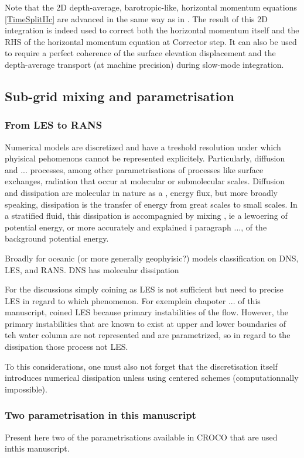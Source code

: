 Note that the 2D depth-average, barotropic-like, horizontal momentum equations \ref{TimeSplitIIc} are advanced in the same way as in \cite{shchepetkin_regional_2005}. The result of this 2D integration is indeed used to correct both the horizontal momentum itself and the RHS of the horizontal momentum equation at Corrector step. It can also be used to require a perfect coherence of the surface elevation displacement and the depth-average transport (at machine precision) during slow-mode integration. 

\subsection{Sub-grid mixing and parametrisation}

\subsubsection{From LES to RANS}
Numerical models are discretized and have a treshold resolution under which phyisical pehomenons cannot be represented explicitely. Particularly, diffusion and ... processes,  among other parametrisations of processes like surface exchanges, radiation that occur at molecular or submolecular scales. Diffusion and dissipation are molecular in nature as a , energy flux, but more broadly speaking, dissipation is the transfer of energy from great scales to small scales. In a stratified fluid, this dissipation is accompagnied by mixing , ie a lewoering of potential energy, or more accurately and explained i paragraph ..., of the background potential energy.

Broadly for oceanic (or more generally geophyisic?) models classification on DNS, LES, and RANS. DNS has molecular dissipation


For the discussions simply coining as LES is not sufficient but need to precise LES in regard to which phenomenon. For exemplein chapoter ... of this manuscript, coined LES because primary instabilities of the flow. However, the primary instabilities that are known to exist at upper and lower boundaries of teh water column are not represented and are parametrized, so in regard to the dissipation those process not LES. 



To this considerations, one must also not forget that the discretisation itself introduces numerical dissipation unless using centered schemes (computationnally impossible).

\subsubsection{Two parametrisation in this manuscript}
Present here two of the parametrisations available in CROCO that are used inthis manuscript.

